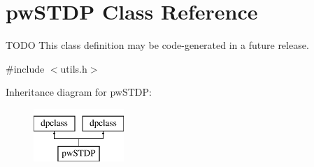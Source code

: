 \hypertarget{classpwSTDP}{\section{pw\+S\+T\+D\+P Class Reference}
\label{classpwSTDP}
}


T\+O\+D\+O This class definition may be code-\/generated in a future release.  




{\ttfamily \#include $<$utils.\+h$>$}

Inheritance diagram for pw\+S\+T\+D\+P\+:\begin{figure}[H]
\begin{center}
\leavevmode
\includegraphics[height=2.000000cm]{d0/dba/classpwSTDP}
\end{center}
\end{figure}
